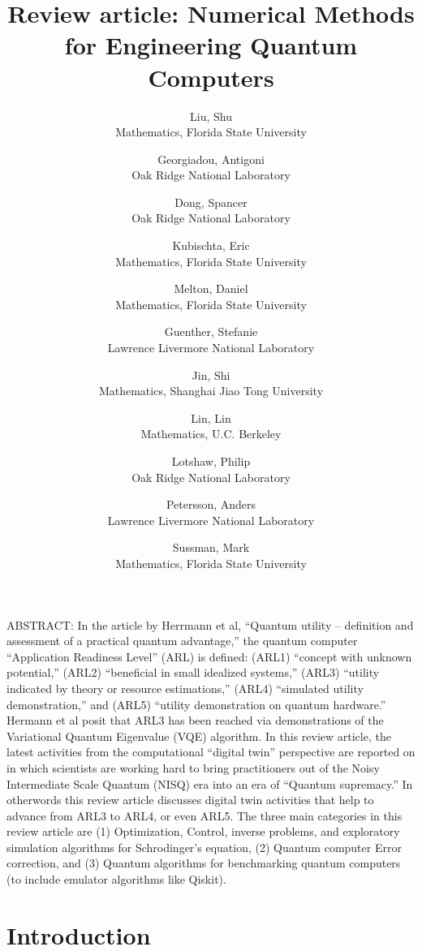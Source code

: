\documentclass[]{article}
\title{Review article: Numerical Methods for Engineering Quantum Computers}
\author{
  Liu, Shu \\
  Mathematics, Florida State University
  \and
  Georgiadou, Antigoni \\
  Oak Ridge National Laboratory
  \and
  Dong, Spancer \\
  Oak Ridge National Laboratory
  \and
  Kubischta, Eric \\
  Mathematics, Florida State University
  \and
  Melton, Daniel \\
  Mathematics, Florida State University
  \and
  Guenther, Stefanie \\
  Lawrence Livermore National Laboratory
  \and
  Jin, Shi \\
  Mathematics, Shanghai Jiao Tong University
  \and
  Lin, Lin \\
  Mathematics, U.C. Berkeley
  \and
  Lotshaw, Philip \\
  Oak Ridge National Laboratory
  \and
  Petersson, Anders \\
  Lawrence Livermore National Laboratory
  \and
  Sussman, Mark \\
  Mathematics, Florida State University
}
\begin{document}
\maketitle

ABSTRACT:
In the article by Herrmann et al, ``Quantum utility – definition and 
assessment of a practical quantum advantage,'' the quantum computer
``Application Readiness Level'' (ARL) is defined: 
(ARL1) ``concept with unknown potential,'' 
(ARL2) ``beneficial in small idealized systems,'' 
(ARL3) ``utility indicated by 
theory or resource estimations,'' 
(ARL4) ``simulated utility demonstration,''
and (ARL5) ``utility demonstration on quantum hardware.''  
Hermann et al posit that ARL3 has been reached via demonstrations
of the Variational Quantum Eigenvalue (VQE) algorithm.
In this review article, the latest activities from the
computational ``digital twin'' perspective are reported on in which scientists
are working hard to bring practitioners out of the Noisy Intermediate
Scale Quantum (NISQ) era into an era of ``Quantum supremacy.'' In
otherwords this review article discusses 
digital twin activities that help to advance from ARL3 to 
ARL4, or even ARL5.  The three main categories in this review article are
(1) Optimization, Control, inverse
problems, and exploratory simulation algorithms for Schrodinger's equation,
(2) Quantum computer Error correction,
and 
(3)  Quantum algorithms for benchmarking quantum computers (to include
emulator algorithms like Qiskit).

\section{Introduction}
\end{document}
